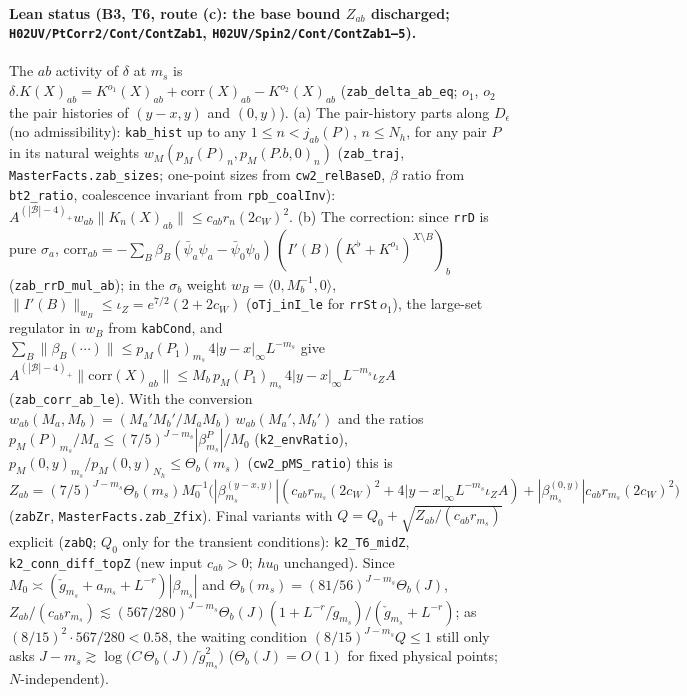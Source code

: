 \documentclass[11pt]{amsart}
\theoremstyle{definition}
\theoremstyle{remark}
\numberwithin{equation}{section}
\begin{document}
\paragraph{Lean status (B3, T6, route (c): the base bound $Z_{ab}$ discharged; \texttt{H02UV/PtCorr2/Cont/ContZab1}, \texttt{H02UV/Spin2/Cont/ContZab1--5}).}
The $ab$ activity of $\delta$ at $m_s$ is $\delta.K(X)_{ab}=K^{o_1}(X)_{ab}+\mathrm{corr}(X)_{ab}-K^{o_2}(X)_{ab}$
(\texttt{zab\_delta\_ab\_eq}; $o_1$, $o_2$ the pair histories of $(y-x,y)$ and $(0,y)$).
(a) The pair-history parts along $D_\epsilon$ (no admissibility): \texttt{kab\_hist} up to any $1\le n<j_{ab}(P)$, $n\le N_h$,
for any pair $P$ in its natural weights $w_M(p_M(P)_n,p_M(P.b,0)_n)$ (\texttt{zab\_traj}, \texttt{MasterFacts.zab\_sizes};
one-point sizes from \texttt{cw2\_relBaseD}, $\beta$ ratio from \texttt{bt2\_ratio}, coalescence invariant from
\texttt{rpb\_coalInv}): $A^{(|\mathcal B|-4)_+}w_{ab}\|K_n(X)_{ab}\|\le c_{ab}r_n(2c_W)^2$. (b) The correction: since
\texttt{rrD} is pure $\sigma_a$, $\mathrm{corr}_{ab}=-\sum_B\beta_B(\bar\psi_a\psi_a-\bar\psi_0\psi_0)\,(I'(B)(K^\flat+K^{o_1})^{X\setminus B})_b$
(\texttt{zab\_rrD\_mul\_ab}); in the $\sigma_b$ weight $w_B=\langle0,M_b^{-1},0\rangle$, $\|I'(B)\|_{w_B}\le
\iota_Z=e^{7/2}(2+2c_W)$ (\texttt{oTj\_inI\_le} for \texttt{rrSt}\,$o_1$), the large-set regulator in $w_B$ from
\texttt{kabCond}, and $\sum_B\|\beta_B(\cdots)\|\le p_M(P_1)_{m_s}\,4|y-x|_\infty L^{-m_s}$ give
$A^{(|\mathcal B|-4)_+}\|\mathrm{corr}(X)_{ab}\|\le M_b\,p_M(P_1)_{m_s}\,4|y-x|_\infty L^{-m_s}\iota_ZA$
(\texttt{zab\_corr\_ab\_le}). With the conversion $w_{ab}(M_a,M_b)=(M_a'M_b'/M_aM_b)\,w_{ab}(M_a',M_b')$ and the ratios
$p_M(P)_{m_s}/M_a\le(7/5)^{J-m_s}|\beta^P_{m_s}|/M_0$ (\texttt{k2\_envRatio}),
$p_M(0,y)_{m_s}/p_M(0,y)_{N_h}\le\Theta_b(m_s)$ (\texttt{cw2\_pMS\_ratio}) this is
$Z_{ab}=(7/5)^{J-m_s}\Theta_b(m_s)M_0^{-1}\bigl(|\beta^{(y-x,y)}_{m_s}|(c_{ab}r_{m_s}(2c_W)^2+4|y-x|_\infty L^{-m_s}\iota_ZA)
+|\beta^{(0,y)}_{m_s}|c_{ab}r_{m_s}(2c_W)^2\bigr)$ (\texttt{zabZr}, \texttt{MasterFacts.zab\_Zfix}). Final variants with
$Q=Q_0+\sqrt{Z_{ab}/(c_{ab}r_{m_s})}$ explicit (\texttt{zabQ}; $Q_0$ only for the transient conditions):
\texttt{k2\_T6\_midZ}, \texttt{k2\_conn\_diff\_topZ} (new input $c_{ab}>0$; $hu_0$ unchanged). Since
$M_0\asymp(\check g_{m_s}+a_{m_s}+L^{-r})|\beta_{m_s}|$ and $\Theta_b(m_s)=(81/56)^{J-m_s}\Theta_b(J)$,
$Z_{ab}/(c_{ab}r_{m_s})\lesssim(567/280)^{J-m_s}\Theta_b(J)(1+L^{-r}/\check g_{m_s})/(\check g_{m_s}+L^{-r})$; as
$(8/15)^2\cdot567/280<0.58$, the waiting condition $(8/15)^{J-m_s}Q\le1$ still only asks
$J-m_s\gtrsim\log\bigl(C\,\Theta_b(J)/\check g_{m_s}^{2}\bigr)$ ($\Theta_b(J)=O(1)$ for fixed physical points; $N$-independent).
\end{document}
